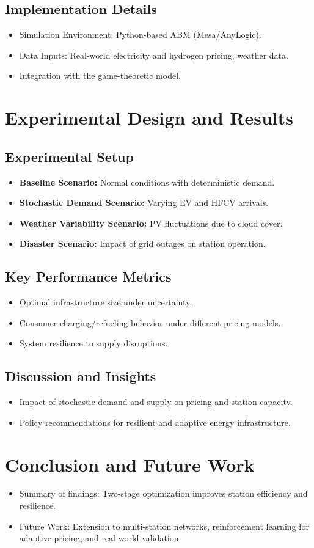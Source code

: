 \documentclass{article}
\begin{document}
\subsection{Implementation Details}
\begin{itemize}
    \item Simulation Environment: Python-based ABM (Mesa/AnyLogic).
    \item Data Inputs: Real-world electricity and hydrogen pricing, weather data.
    \item Integration with the game-theoretic model.
\end{itemize}

\section{Experimental Design and Results}
\subsection{Experimental Setup}
\begin{itemize}
    \item \textbf{Baseline Scenario:} Normal conditions with deterministic demand.
    \item \textbf{Stochastic Demand Scenario:} Varying EV and HFCV arrivals.
    \item \textbf{Weather Variability Scenario:} PV fluctuations due to cloud cover.
    \item \textbf{Disaster Scenario:} Impact of grid outages on station operation.
\end{itemize}

\subsection{Key Performance Metrics}
\begin{itemize}
    \item Optimal infrastructure size under uncertainty.
    \item Consumer charging/refueling behavior under different pricing models.
    \item System resilience to supply disruptions.
\end{itemize}

\subsection{Discussion and Insights}
\begin{itemize}
    \item Impact of stochastic demand and supply on pricing and station capacity.
    \item Policy recommendations for resilient and adaptive energy infrastructure.
\end{itemize}

\section{Conclusion and Future Work}
\begin{itemize}
    \item Summary of findings: Two-stage optimization improves station efficiency and resilience.
    \item Future Work: Extension to multi-station networks, reinforcement learning for adaptive pricing, and real-world validation.
\end{itemize}
\end{document}
